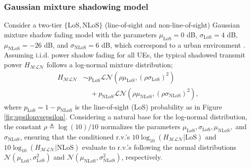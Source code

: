 \documentclass[lettersize,journal]{IEEEtran}
\begin{document}



\subsubsection{Gaussian mixture shadowing model}
\label{sec:guassianmixture}

Consider a two-tier $\{\text{LoS},\text{NLoS}\}$ (line-of-sight and non-line-of-sight) Gaussian mixture shadow fading model with the parameters $\mu_{\text{LoS}} = 0$ dB, $\sigma_{\text{LoS}} = 4$ dB, $\mu_{\text{NLoS}} = -26$ dB, and $\sigma_{\text{NLoS}} = 6$ dB, which correspond to a urban environment \cite{TR38.811}. Assuming i.i.d. power shadow fading for all UEs, the typical shadowed transmit power $H_{\mathcal{M}\mathcal{L}\mathcal{N}}$ follows a log-normal mixture distribution;
\begin{align}
  \label{eq:tier2lognormal}
  H_{\mathcal{M}\mathcal{L}\mathcal{N}} &\sim p_{\text{LoS}} \mathcal{L}\mathcal{N}(\rho \mu_{\text{LoS}}, (\rho \sigma_{\text{LoS}})^2) \nonumber \\
  &\quad + p_{\text{NLoS}} \mathcal{L}\mathcal{N}(\rho \mu_{\text{NLoS}}, (\rho \sigma_{\text{NLoS}})^2),
\end{align}
where $p_{\text{LoS}}=1-p_{\text{NLoS}}$ is the line-of-sight (LoS) probability as in Figure \ref{fig:upsilonvsepsilon}. Considering a natural base for the log-normal distribution, the constant $\rho \triangleq \log(10)/10$ normalizes the parameters $\mu_{\text{LoS}}, \sigma_{\text{LoS}}, \mu_{\text{NLoS}},$ and $\sigma_{\text{NLoS}}$, ensuring that the conditioned r.v.'s $10 \log_{10}(H_{\mathcal{MLN}}|\text{LoS})$ and $10 \log_{10}(H_{\mathcal{MLN}}|\text{NLoS})$ evaluate to r.v.'s following the normal distributions $\mathcal{N}(\mu_{\text{LoS}}, \sigma_{\text{LoS}}^2)$ and $\mathcal{N}(\mu_{\text{NLoS}}, \sigma_{\text{NLoS}}^2)$, respectively.
\end{document}
